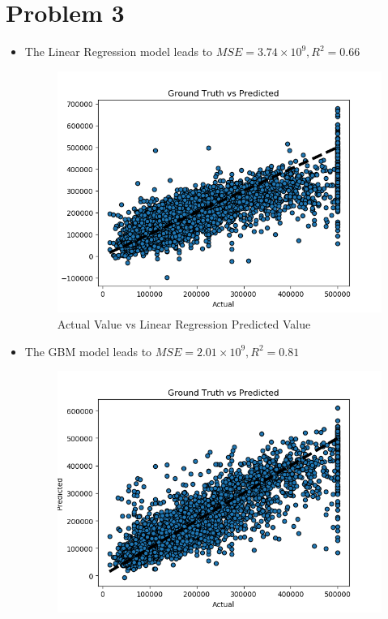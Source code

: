 \documentclass[a4paper]{article}
\begin{document}
\section{Problem 3}
\begin{itemize}
    \item The Linear Regression model leads to $MSE=3.74\times10^9, R^2=0.66$
    \begin{figure}[H]
        \centering
        \includegraphics[scale=0.5]{LR.png}
        \caption{Actual Value vs Linear Regression Predicted Value}
        \label{LR}
    \end{figure}
    \item The GBM model leads to $MSE=2.01\times10^9, R^2=0.81$
    \begin{figure}[H]
        \centering
        \includegraphics[scale=0.5]{GBM.png}

\end{figure}
\end{itemize}
\end{document}
